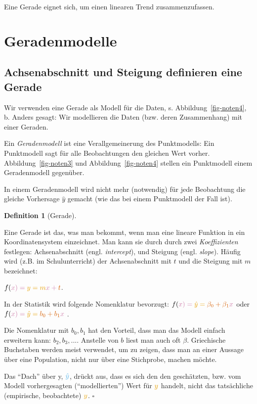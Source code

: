 \documentclass[
  a4paper,
]{scrbook}
\theoremstyle{definition}
\theoremstyle{definition}
\newtheorem{definition}{Definition}[chapter]
\theoremstyle{definition}
\theoremstyle{remark}
\begin{document}
Eine Gerade eignet sich, um einen linearen Trend zusammenzufassen.

\section{Geradenmodelle}\label{geradenmodelle}

\subsection{Achsenabschnitt und Steigung definieren eine
Gerade}\label{achsenabschnitt-und-steigung-definieren-eine-gerade}

Wir verwenden eine Gerade als Modell für die Daten, s.
Abbildung~\ref{fig-noten4}, b. Anders gesagt: Wir modellieren die Daten
(bzw. deren Zusammenhang) mit einer Geraden.

Ein \emph{Geradenmodell} ist eine Verallgemeinerung des Punktmodells:
Ein Punktmodell sagt für alle Beobachtungen den gleichen Wert vorher.
Abbildung~\ref{fig-noten3} und Abbildung~\ref{fig-noten4} stellen ein
Punktmodell einem Geradenmodell gegenüber.

In einem Geradenmodell wird nicht mehr (notwendig) für jede Beobachtung
die gleiche Vorhersage \(\hat{y}\) gemacht (wie das bei einem
Punktmodell der Fall ist).

\begin{definition}[Gerade]\protect\hypertarget{def-gerade}{}\label{def-gerade}

Eine Gerade ist das, was man bekommt, wenn man eine lineare Funktion in
ein Koordinatensystem einzeichnet. Man kann sie durch durch zwei
\emph{Koeffizienten} festlegen: Achsenabschnitt (engl.
\emph{intercept}), und Steigung (engl. \emph{slope}). Häufig wird (z.B.
im Schulunterricht) der Achsenabschnitt mit \(t\) und die Steigung mit
\(m\) bezeichnet:

\(f(\color{xcol}{x})=\color{ycol}{y}={m} \color{xcol}{x} + \color{beta0col}{t}\).

In der Statistik wird folgende Nomenklatur bevorzugt:
\(f(\color{xcol}{x})=\color{ycol}{\hat{y}}=\color{beta0col}{\beta_0} + {\beta_1} \color{xcol}{x}\)
oder
\(f(\color{xcol}{x})=\color{ycol}{\hat{y}}= \color{beta0col}{b_0} + {b_1} \color{xcol}{x}\)
.

Die Nomenklatur mit \(b_0, b_1\) hat den Vorteil, dass man das Modell
einfach erweitern kann: \(b_2, b_3, ...\). Anstelle von \(b\) liest man
auch oft \(\beta\). Griechische Buchstaben werden meist verwendet, um zu
zeigen, dass man an einer Aussage über eine Population, nicht nur über
eine Stichprobe, machen möchte.

Das ``Dach'' über y, \(\color{modelcol}{\hat{y}}\), drückt aus, dass es
sich den den geschätzten, bzw. vom Modell vorhergesagten
(``modellierten'') Wert für \(\color{ycol}{y}\) handelt, nicht das
tatsächliche (empirische, beobachtete) \(\color{ycol}{y}\). \(\square\)

\end{definition}
\end{document}
